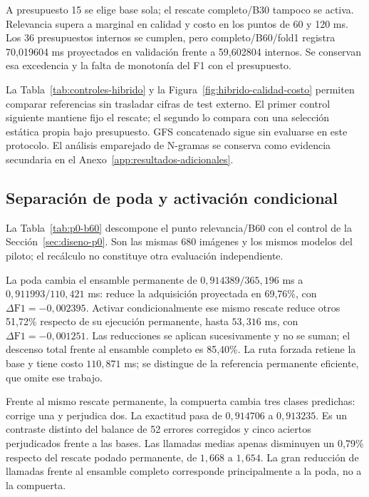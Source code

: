 A presupuesto 15 se elige base sola; el rescate completo/B30 tampoco se activa. Relevancia supera a marginal en calidad y costo en los puntos de 60 y 120 ms. Los 36 presupuestos internos se cumplen, pero completo/B60/fold1 registra 70,019604 ms proyectados en validación frente a 59,602804 internos. Se conservan esa excedencia y la falta de monotonía del F1 con el presupuesto.


La Tabla~\ref{tab:controles-hibrido} y la Figura~\ref{fig:hibrido-calidad-costo} permiten comparar referencias sin trasladar cifras de test externo. El primer control siguiente mantiene fijo el rescate; el segundo lo compara con una selección estática propia bajo presupuesto. GFS concatenado sigue sin evaluarse en este protocolo. El análisis emparejado de N-gramas se conserva como evidencia secundaria en el Anexo~\ref{app:resultados-adicionales}.

\subsection{Separación de poda y activación condicional}\label{sec:resultados-p0}
La Tabla~\ref{tab:p0-b60} descompone el punto relevancia/B60 con el control de la Sección~\ref{sec:diseno-p0}. Son las mismas 680 imágenes y los mismos modelos del piloto; el recálculo no constituye otra evaluación independiente.



La poda cambia el ensamble permanente de $0{,}914389/365{,}196$ ms a $0{,}911993/110{,}421$ ms: reduce la adquisición proyectada en 69,76\%, con $\Delta\mathrm{F1}=-0{,}002395$. Activar condicionalmente ese mismo rescate reduce otros 51,72\% respecto de su ejecución permanente, hasta $53{,}316$ ms, con $\Delta\mathrm{F1}=-0{,}001251$. Las reducciones se aplican sucesivamente y no se suman; el descenso total frente al ensamble completo es 85,40\%. La ruta forzada retiene la base y tiene costo $110{,}871$ ms; se distingue de la referencia permanente eficiente, que omite ese trabajo.

Frente al mismo rescate permanente, la compuerta cambia tres clases predichas: corrige una y perjudica dos. La exactitud pasa de $0{,}914706$ a $0{,}913235$. Es un contraste distinto del balance de 52 errores corregidos y cinco aciertos perjudicados frente a las bases. Las llamadas medias apenas disminuyen un 0,79\% respecto del rescate podado permanente, de $1{,}668$ a $1{,}654$. La gran reducción de llamadas frente al ensamble completo corresponde principalmente a la poda, no a la compuerta.


